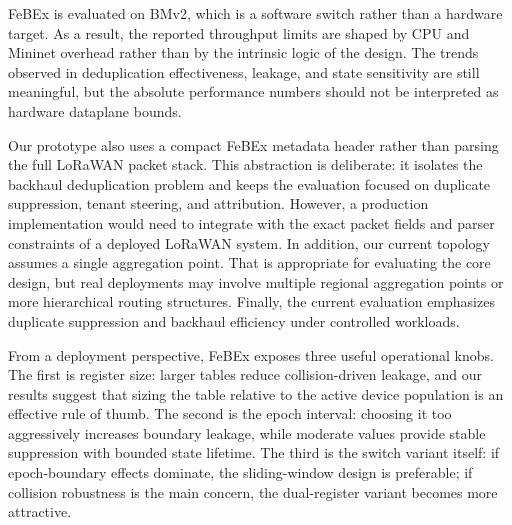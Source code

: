 FeBEx is evaluated on BMv2, which is a software switch rather than a hardware target. As a result, the reported throughput limits are shaped by CPU and Mininet overhead rather than by the intrinsic logic of the design. The trends observed in deduplication effectiveness, leakage, and state sensitivity are still meaningful, but the absolute performance numbers should not be interpreted as hardware dataplane bounds.

Our prototype also uses a compact FeBEx metadata header rather than parsing the full LoRaWAN packet stack. This abstraction is deliberate: it isolates the backhaul deduplication problem and keeps the evaluation focused on duplicate suppression, tenant steering, and attribution. However, a production implementation would need to integrate with the exact packet fields and parser constraints of a deployed LoRaWAN system. In addition, our current topology assumes a single aggregation point. That is appropriate for evaluating the core design, but real deployments may involve multiple regional aggregation points or more hierarchical routing structures. Finally, the current evaluation emphasizes duplicate suppression and backhaul efficiency under controlled workloads. 

From a deployment perspective, FeBEx exposes three useful operational knobs. The first is register size: larger tables reduce collision-driven leakage, and our results suggest that sizing the table relative to the active device population is an effective rule of thumb. The second is the epoch interval: choosing it too aggressively increases boundary leakage, while moderate values provide stable suppression with bounded state lifetime. The third is the switch variant itself: if epoch-boundary effects dominate, the sliding-window design is preferable; if collision robustness is the main concern, the dual-register variant becomes more attractive.



